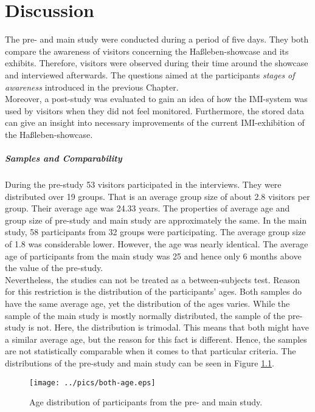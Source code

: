 \chapter{Discussion}
\label{discussion}

The pre- and main study were conducted during a period of five days. They both compare the awareness of visitors concerning the Haßleben-showcase and its exhibits. Therefore, visitors were observed during their time around the showcase and interviewed afterwards. The questions aimed at the participants \textit{stages of awareness} introduced in the previous Chapter.
\\
Moreover, a post-study was evaluated to gain an idea of how the \ac{IMI}-system was used by visitors when they did not feel monitored. Furthermore, the stored data can give an insight into necessary improvements of the current \ac{IMI}-exhibition of the Haßleben-showcase.

\paragraph{Samples and Comparability} During the pre-study 53 visitors participated in the interviews. They were distributed over 19 groups. That is an average group size of about 2.8 visitors per group. Their average age was 24.33 years. The properties of average age and group size of pre-study and main study are approximately the same. In the main study, 58 participants from 32 groups were participating. The average group size of 1.8 was considerable lower. However, the age was nearly identical. The average age of participants from the main study was 25 and hence only 6 months above the value of the pre-study.
\\
Nevertheless, the studies can not be treated as a between-subjects test. Reason for this restriction is the distribution of the participants' ages. Both samples do have the same average age, yet the distribution of the ages varies. While the sample of the main study is mostly normally distributed, the sample of the pre-study is not. Here, the distribution is trimodal. This means that both might have a similar average age, but the reason for this fact is different. Hence, the samples are not statistically comparable when it comes to that particular criteria. The distributions of the pre-study and main study can be seen in Figure \ref{fig:discussion_age-distribution}.
\begin{figure}[H]%
\texttt{[image: ../pics/both-age.eps]}%
\caption{Age distribution of participants from the pre- and main study.}
\label{fig:discussion_age-distribution} 
\end{figure}

